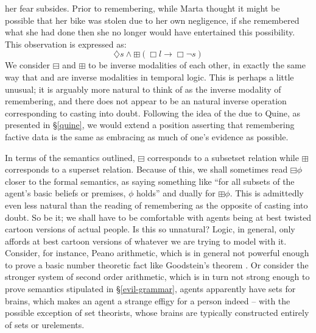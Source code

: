 her fear subsides.  Prior to remembering, while
Marta thought it might be possible that her bike was stolen due to her
own negligence,
if she remembered what she had done then she no longer would have
entertained this possibility.  This observation is expressed as:
\begin{equation} 
\diamondsuit s \wedge \boxplus (\Box  l \rightarrow \Box  \neg s)
\end{equation}
We consider $\boxminus$ and $\boxplus$ to be inverse modalities of each other,
in exactly the same way that  and  are inverse
modalities in temporal logic. This is perhaps a little unusual; it is arguably
more natural to think of  as the inverse modality of
remembering, and there does not appear to be an natural inverse operation
corresponding to casting into doubt.  Following the idea of the  due to Quine, as presented in \S\ref{quine}, we would 
extend a position asserting that remembering factive data is the 
same as embracing as much of one's evidence as possible.

In terms of the semantics outlined, $\boxminus$ corresponds to a subsetset
relation while $\boxplus$ corresponds to a superset relation.  Because of
this, we shall sometimes read $\boxminus \phi$ closer to the formal semantics, as
saying something like ``for all subsets of the agent's basic beliefs
or premises, $\phi$ holds'' and dually for $\boxplus \phi$.  
This is admittedly even less natural than
the reading of remembering as the opposite of casting into doubt.
So be it; we shall have to be comfortable with  
agents being at best twisted cartoon versions of actual people.
Is this so unnatural?  Logic, in general, only affords at best cartoon
versions of whatever we are trying to model with it.  Consider, for
instance, Peano arithmetic, which is in general not powerful enough to
prove a basic number theoretic fact like Goodstein's theorem
\citep{kirby_accessible_1982}.  Or consider the stronger system 
of second order arithmetic, which is in turn not strong enough to prove 
semantics stipulated in \S\ref{evil-grammar},  agents apparently have sets
for brains, which makes an  agent a strange effigy for a person
indeed -- with the possible exception of set theorists, whose brains are
typically constructed entirely of sets or urelements.

